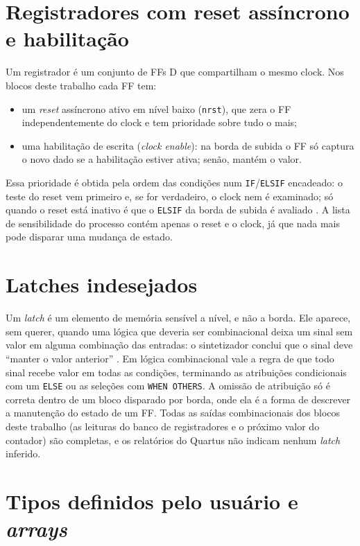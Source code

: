 \section{Registradores com reset assíncrono e habilitação}

Um registrador é um conjunto de FFs D que compartilham o mesmo clock. Nos blocos deste trabalho cada FF tem:

\begin{itemize}
  \item um \textit{reset} assíncrono ativo em nível baixo (\texttt{nrst}), que zera o FF independentemente do clock e tem prioridade sobre tudo o mais;
  \item uma habilitação de escrita (\textit{clock enable}): na borda de subida o FF só captura o novo dado se a habilitação estiver ativa; senão, mantém o valor.
\end{itemize}

Essa prioridade é obtida pela ordem das condições num \texttt{IF}/\texttt{ELSIF} encadeado: o teste do reset vem primeiro e, se for verdadeiro, o clock nem é examinado; só quando o reset está inativo é que o \texttt{ELSIF} da borda de subida é avaliado \cite{aula8}. A lista de sensibilidade do processo contém apenas o reset e o clock, já que nada mais pode disparar uma mudança de estado.

\section{Latches indesejados}

Um \textit{latch} é um elemento de memória sensível a nível, e não a borda. Ele aparece, sem querer, quando uma lógica que deveria ser combinacional deixa um sinal sem valor em alguma combinação das entradas: o sintetizador conclui que o sinal deve ``manter o valor anterior'' \cite{aula7}. Em lógica combinacional vale a regra de que todo sinal recebe valor em todas as condições, terminando as atribuições condicionais com um \texttt{ELSE} ou as seleções com \texttt{WHEN OTHERS}. A omissão de atribuição só é correta dentro de um bloco disparado por borda, onde ela é a forma de descrever a manutenção do estado de um FF. Todas as saídas combinacionais dos blocos deste trabalho (as leituras do banco de registradores e o próximo valor do contador) são completas, e os relatórios do Quartus não indicam nenhum \textit{latch} inferido.

\section{Tipos definidos pelo usuário e \textit{arrays}}

